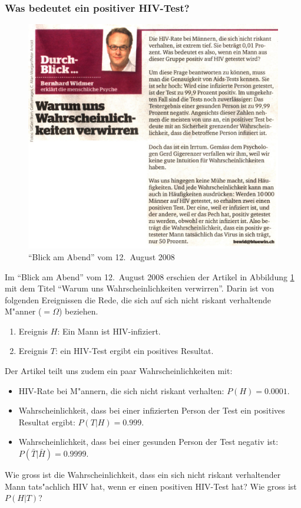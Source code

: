 \subsubsection{Was bedeutet ein positiver HIV-Test?}
\begin{figure}
\begin{center}
\includegraphics[width=\hsize]{graphics/aids-300}
\end{center}
\caption{``Blick am Abend'' vom 12.~August 2008\label{aids}}
\end{figure}
Im ``Blick am Abend'' vom 12.~August 2008 erschien der Artikel in Abbildung 
\ref{aids} mit dem Titel ``Warum uns Wahrscheinlichkeiten verwirren''.
Darin ist von folgenden Ereignissen die Rede, die sich auf sich nicht riskant
verhaltende M"anner ($=\Omega$) beziehen.
\begin{enumerate}
\item Ereignis $H$: Ein Mann ist HIV-infiziert.
\item Ereignis $T$: ein HIV-Test ergibt ein positives Resultat.
\end{enumerate}
Der Artikel teilt uns zudem ein paar Wahrscheinlichkeiten mit:
\begin{itemize}
\item HIV-Rate bei M"annern, die sich nicht riskant verhalten:
$P(H)=0.0001$.
\item Wahrscheinlichkeit, dass bei einer infizierten Person der Test
ein positives Resultat ergibt: $P(T|H)=0.999$.
\item Wahrscheinlichkeit, dass bei einer gesunden Person der Test negativ
ist: $P(\bar T|\bar H)=0.9999$.
\end{itemize}
Wie gross ist die Wahrscheinlichkeit, dass ein sich nicht riskant verhaltender
Mann tats"achlich HIV hat, wenn er einen positiven HIV-Test hat? Wie
gross ist $P(H|T)$?

